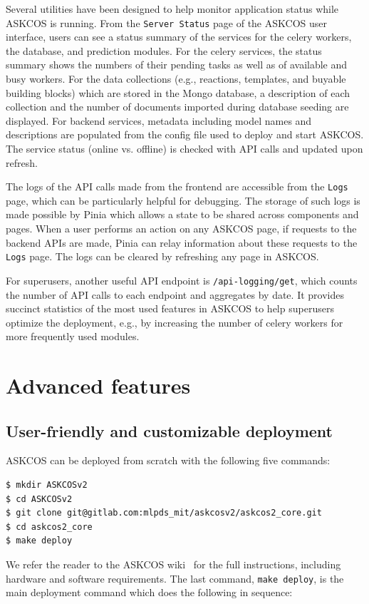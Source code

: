 \documentclass[pdflatex,sn-mathphys-num]{sn-jnl}%
\theoremstyle{thmstyleone}%
\theoremstyle{thmstyletwo}%
\theoremstyle{thmstylethree}%
\begin{document}

Several utilities have been designed to help monitor application status while ASKCOS is running. From the \texttt{Server Status} page of the ASKCOS user interface, users can see a status summary of the services for the celery workers, the database, and prediction modules. For the celery services, the status summary shows the numbers of their pending tasks as well as of available and busy workers. For the data collections (e.g., reactions, templates, and buyable building blocks) which are stored in the Mongo database, a description of each collection and the number of documents imported during database seeding are displayed. For backend services, metadata including model names and descriptions are populated from the config file used to deploy and start ASKCOS. The service status (online vs. offline) is checked with API calls and updated upon refresh.

The logs of the API calls made from the frontend are accessible from the \texttt{Logs} page, which can be particularly helpful for debugging. The storage of such logs is made possible by Pinia which allows a state to be shared across components and pages. When a user performs an action on any ASKCOS page, if requests to the backend APIs are made, Pinia can relay information about these requests to the \texttt{Logs} page. The logs can be cleared by refreshing any page in ASKCOS.

For superusers, another useful API endpoint is \texttt{/api-logging/get}, which counts the number of API calls to each endpoint and aggregates by date. It provides succinct statistics of the most used features in ASKCOS to help superusers optimize the deployment, e.g., by increasing the number of celery workers for more frequently used modules.

\section{Advanced features}\label{advanced_features}

\subsection{User-friendly and customizable deployment}\label{method_deployment}

ASKCOS can be deployed from scratch with the following five commands:
\begin{lstlisting}[language=bash]
$ mkdir ASKCOSv2
$ cd ASKCOSv2
$ git clone git@gitlab.com:mlpds_mit/askcosv2/askcos2_core.git
$ cd askcos2_core
$ make deploy
\end{lstlisting}
We refer the reader to the ASKCOS wiki~\citep{ASKCOSwiki} for the full instructions, including hardware and software requirements. The last command, \texttt{make deploy}, is the main deployment command which does the following in sequence:
\end{document}
